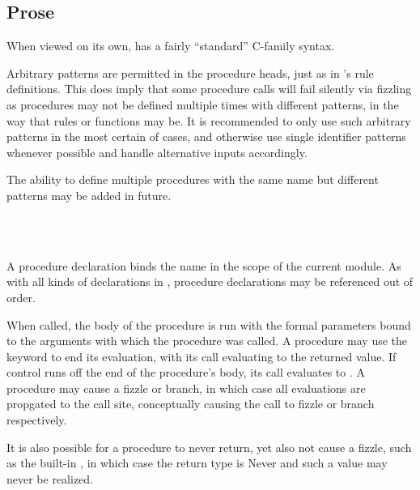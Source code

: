\subsection{Prose}

When viewed on its own, \Prose{} has a fairly ``standard'' C-family syntax.

Arbitrary patterns are permitted in the procedure heads, just as in \Law{}'s
rule definitions. This does imply that some procedure calls will fail silently
via fizzling as procedures may not be defined multiple times with different
patterns, in the way that rules or functions may be. It is recommended to only
use such arbitrary patterns in the most certain of cases, and otherwise use
single identifier patterns whenever possible and handle alternative inputs
accordingly.

The ability to define multiple procedures with the same name but different
patterns may be added in future.

\begin{bnf*}
     \\
     \\
\end{bnf*}

\noindent A procedure declaration binds the name in the scope of the current module.
As with all kinds of declarations in \Trilogy{}, procedure declarations may be
referenced out of order.

When called, the body of the procedure is run with the formal parameters bound to
the arguments with which the procedure was called. A procedure may use the 
keyword to end its evaluation, with its call evaluating to the returned value.
If control runs off the end of the procedure's body, its call evaluates to .
A procedure may cause a fizzle or branch, in which case all evaluations are propgated
to the call site, conceptually causing the call to fizzle or branch respectively.

It is also possible for a procedure to never return, yet also not cause a fizzle,
such as the built-in , in which case the return type is Never and such a
value may never be realized.

\begin{prooftree}
\end{prooftree}

